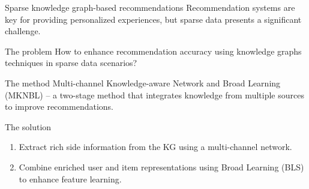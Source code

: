 \documentclass[11pt,pdf,hyperref={unicode}]{beamer}
\begin{document}
    \begin{frame}{Sparse knowledge graph-based recommendations}
        Recommendation systems are key for providing personalized experiences, but sparse data presents a significant challenge.

        \begin{block}{The problem}
            How to enhance recommendation accuracy using knowledge graphs techniques in sparse data scenarios?
        \end{block}

        \begin{block}{The method}
            Multi-channel Knowledge-aware Network and Broad Learning (MKNBL) – a two-stage method that integrates knowledge from
            multiple sources to improve recommendations.
        \end{block}

        \begin{block}{The solution}
            \begin{enumerate}[1]
                \item Extract rich side information from the KG using a multi-channel network.
                \item Combine enriched user and item representations using Broad Learning (BLS) to enhance feature learning.
            \end{enumerate}
        \end{block}
    \end{frame}
\end{document}
